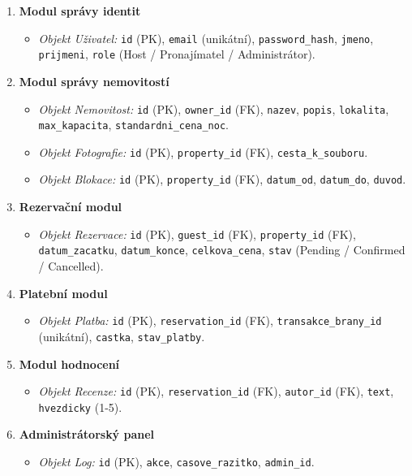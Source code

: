 \documentclass[11pt, a4paper]{article}
\begin{document}
\begin{enumerate}
    \item \textbf{Modul správy identit}
    \begin{itemize}
        \item \textit{Objekt Uživatel:} \texttt{id} (PK), \texttt{email} (unikátní), \texttt{password\_hash}, \texttt{jmeno}, \texttt{prijmeni}, \texttt{role} (Host / Pronajímatel / Administrátor).
    \end{itemize}
    
    \item \textbf{Modul správy nemovitostí}
    \begin{itemize}
        \item \textit{Objekt Nemovitost:} \texttt{id} (PK), \texttt{owner\_id} (FK), \texttt{nazev}, \texttt{popis}, \texttt{lokalita}, \texttt{max\_kapacita}, \texttt{standardni\_cena\_noc}.
        \item \textit{Objekt Fotografie:} \texttt{id} (PK), \texttt{property\_id} (FK), \texttt{cesta\_k\_souboru}.
        \item \textit{Objekt Blokace:} \texttt{id} (PK), \texttt{property\_id} (FK), \texttt{datum\_od}, \texttt{datum\_do}, \texttt{duvod}.
    \end{itemize}
    
    \item \textbf{Rezervační modul}
    \begin{itemize}
        \item \textit{Objekt Rezervace:} \texttt{id} (PK), \texttt{guest\_id} (FK), \texttt{property\_id} (FK), \texttt{datum\_zacatku}, \texttt{datum\_konce}, \texttt{celkova\_cena}, \texttt{stav} (Pending / Confirmed / Cancelled).
    \end{itemize}
    
    \item \textbf{Platební modul}
    \begin{itemize}
        \item \textit{Objekt Platba:} \texttt{id} (PK), \texttt{reservation\_id} (FK), \texttt{transakce\_brany\_id} (unikátní), \texttt{castka}, \texttt{stav\_platby}.
    \end{itemize}
    
    \item \textbf{Modul hodnocení}
    \begin{itemize}
        \item \textit{Objekt Recenze:} \texttt{id} (PK), \texttt{reservation\_id} (FK), \texttt{autor\_id} (FK), \texttt{text}, \texttt{hvezdicky} (1-5).
    \end{itemize}
    
    \item \textbf{Administrátorský panel}
    \begin{itemize}
        \item \textit{Objekt Log:} \texttt{id} (PK), \texttt{akce}, \texttt{casove\_razitko}, \texttt{admin\_id}.
    \end{itemize}
\end{enumerate}
\end{document}
